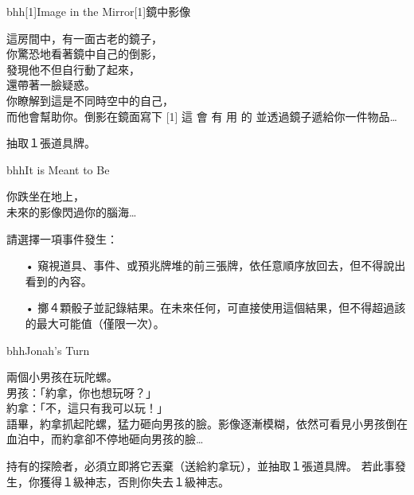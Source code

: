 \linebreak[0]%
\begin{EventCardSp}{bhh}{\scalebox{-1}[1]{Image in the Mirror}}{\scalebox{-1}[1]{鏡中影像}}
  \begin{CardStory}
    這房間中，有一面古老的鏡子，\\
    你驚恐地看著鏡中自己的倒影，\\
    發現他不但自行動了起來，\\
    還帶著一臉疑惑。\\
    你瞭解到這是不同時空中的自己，\\
    而他會幫助你。倒影在鏡面寫下\smallbreak
    \scalebox{-1}[1]{ \FontScript 這 \enskip 會 \enskip 有 \enskip 用 \enskip 的 }\smallbreak
    並透過鏡子遞給你一件物品…
\end{CardStory}
  抽取１張道具牌。\smallbreak
\end{EventCardSp}%
\linebreak[0]%
\begin{EventCard}{bhh}{It is Meant to Be}
  \begin{CardStory}
    你跌坐在地上，\\
    未來的影像閃過你的腦海…
  \end{CardStory}
  請選擇一項事件發生：
  \begin{itemize}
    \item[•] 窺視道具、事件、或預兆牌堆的前三張牌，依任意順序放回去，但不得說出看到的內容。
    \item[•] 擲４顆骰子並記錄結果。在未來任何\RollAny{}，可直接使用這個結果，但不得超過該\RollAny{}的最大可能值（僅限一次）。
  \end{itemize}
\end{EventCard}%
\linebreak[0]%
\begin{EventCard}{bhh}{Jonah's Turn}
  \begin{CardStory}
    兩個小男孩在玩陀螺。\\
    男孩：「約拿，你也想玩呀？」\\
    約拿：「不，這只有我可以玩！」\\
    語畢，約拿抓起陀螺，猛力砸向男孩的臉。影像逐漸模糊，依然可看見小男孩倒在血泊中，而約拿卻不停地砸向男孩的臉…
\end{CardStory}
  持有的探險者，必須立即將它丟棄（送給約拿玩），並抽取１張道具牌。\smallbreak
  若此事發生，你獲得１級神志，否則你失去１級神志。\smallbreak
\end{EventCard}%
\linebreak[0]%
